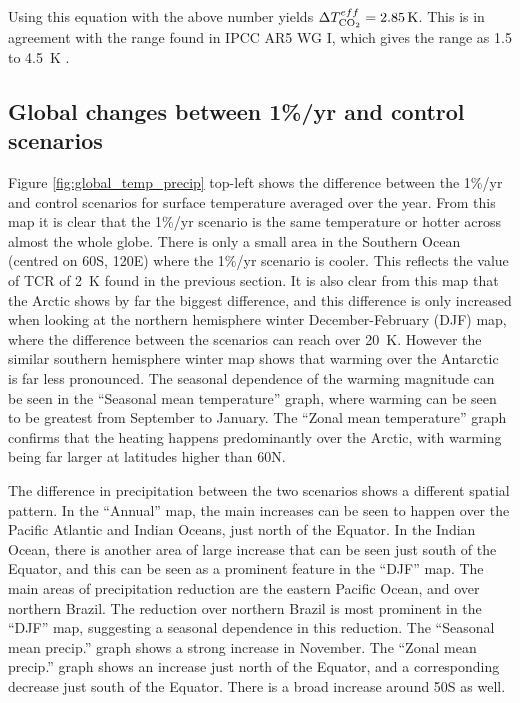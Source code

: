\documentclass{article}
\begin{document}
Using this equation with the above number yields $\Delta T^{eff}_{\ce{CO2}} = \SI{2.85}{K}$. This is in agreement with the range found in IPCC AR5 WG I, which gives the range as 1.5 to \SI{4.5}{K} \parencite{ipcc2014wg1}.

\subsection{Global changes between 1\%/yr and control scenarios}


Figure \ref{fig:global_temp_precip} top-left shows the difference between the 1\%/yr and control scenarios for surface temperature averaged over the year. From this map it is clear that the 1\%/yr scenario is the same temperature or hotter across almost the whole globe. There is only a small area in the Southern Ocean (centred on 60\textdegree S, 120\textdegree E) where the 1\%/yr scenario is cooler. This reflects the value of TCR of \SI{2}{K} found in the previous section. It is also clear from this map that the Arctic shows by far the biggest difference, and this difference is only increased when looking at the northern hemisphere winter December-February (DJF) map, where the difference between the scenarios can reach over \SI{20}{K}. However the similar southern hemisphere winter map shows that warming over the Antarctic is far less pronounced. The seasonal dependence of the warming magnitude can be seen in the ``Seasonal mean temperature'' graph, where warming can be seen to be greatest from September to January. The ``Zonal mean temperature'' graph confirms that the heating happens predominantly over the Arctic, with warming being far larger at latitudes higher than 60\textdegree N.

The difference in precipitation between the two scenarios shows a different spatial pattern. In the ``Annual'' map, the main increases can be seen to happen over the Pacific Atlantic and Indian Oceans, just north of the Equator. In the Indian Ocean, there is another area of large increase that can be seen just south of the Equator, and this can be seen as a prominent feature in the ``DJF'' map. The main areas of precipitation reduction are the eastern Pacific Ocean, and over northern Brazil. The reduction over northern Brazil is most prominent in the ``DJF'' map, suggesting a seasonal dependence in this reduction. The ``Seasonal mean precip.'' graph shows a strong increase in November. The ``Zonal mean precip.'' graph shows an increase just north of the Equator, and a corresponding decrease just south of the Equator. There is a broad increase around 50\textdegree S as well.
\end{document}
